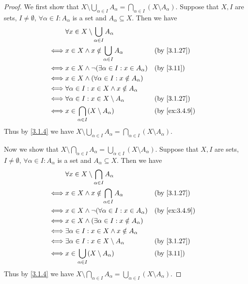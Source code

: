 \begin{proof}
	We first show that \(X \setminus \bigcup_{\alpha \in I} A_{\alpha} = \bigcap_{\alpha \in I} (X \setminus A_{\alpha})\).
	Suppose that \(X, I\) are sets, \(I \neq \emptyset\), \(\forall \alpha \in I : A_{\alpha}\) is a set and \(A_{\alpha} \subseteq X\).
	Then we have
	\begin{align*}
		     & \forall x \in X \setminus \bigcup_{\alpha \in I} A_{\alpha}                     \\
		\iff & x \in X \land x \notin \bigcup_{\alpha \in I} A_{\alpha}     &  & \by{3.1.27}   \\
		\iff & x \in X \land \lnot(\exists \alpha \in I : x \in A_{\alpha}) &  & \by{3.11}     \\
		\iff & x \in X \land (\forall \alpha \in I : x \notin A_{\alpha})                      \\
		\iff & \forall \alpha \in I : x \in X \land x \notin A_{\alpha}                        \\
		\iff & \forall \alpha \in I : x \in X \setminus A_{\alpha}          &  & \by{3.1.27}   \\
		\iff & x \in \bigcap_{\alpha \in I} (X \setminus A_{\alpha})        &  & \by{ex:3.4.9} \\
	\end{align*}
	Thus by \cref{3.1.4} we have \(X \setminus \bigcup_{\alpha \in I} A_{\alpha} = \bigcap_{\alpha \in I} (X \setminus A_{\alpha})\).

	Now we show that \(X \setminus \bigcap_{\alpha \in I} A_{\alpha} = \bigcup_{\alpha \in I} (X \setminus A_{\alpha})\).
	Suppose that \(X, I\) are sets, \(I \neq \emptyset\), \(\forall \alpha \in I : A_{\alpha}\) is a set and \(A_{\alpha} \subseteq X\).
	Then we have
	\begin{align*}
		     & \forall x \in X \setminus \bigcap_{\alpha \in I} A_{\alpha}                     \\
		\iff & x \in X \land x \notin \bigcap_{\alpha \in I} A_{\alpha}     &  & \by{3.1.27}   \\
		\iff & x \in X \land \lnot(\forall \alpha \in I : x \in A_{\alpha}) &  & \by{ex:3.4.9} \\
		\iff & x \in X \land (\exists \alpha \in I : x \notin A_{\alpha})                      \\
		\iff & \exists \alpha \in I : x \in X \land x \notin A_{\alpha}                        \\
		\iff & \exists \alpha \in I : x \in X \setminus A_{\alpha}          &  & \by{3.1.27}   \\
		\iff & x \in \bigcup_{\alpha \in I} (X \setminus A_{\alpha})        &  & \by{3.11}     \\
	\end{align*}
	Thus by \cref{3.1.4} we have \(X \setminus \bigcap_{\alpha \in I} A_{\alpha} = \bigcup_{\alpha \in I} (X \setminus A_{\alpha})\).
\end{proof}
